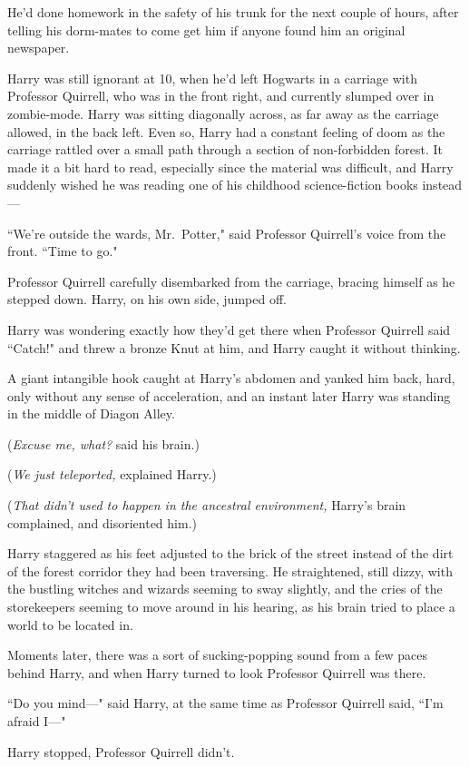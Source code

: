 He'd done homework in the safety of his trunk for the next couple of hours, after telling his dorm-mates to come get him if anyone found him an original newspaper.

Harry was still ignorant at 10\am, when he'd left Hogwarts in a carriage with Professor Quirrell, who was in the front right, and currently slumped over in zombie-mode. Harry was sitting diagonally across, as far away as the carriage allowed, in the back left. Even so, Harry had a constant feeling of doom as the carriage rattled over a small path through a section of non-forbidden forest. It made it a bit hard to read, especially since the material was difficult, and Harry suddenly wished he was reading one of his childhood science-fiction books instead---

``We're outside the wards, Mr.~Potter," said Professor Quirrell's voice from the front. ``Time to go."

Professor Quirrell carefully disembarked from the carriage, bracing himself as he stepped down. Harry, on his own side, jumped off.

Harry was wondering exactly how they'd get there when Professor Quirrell said ``Catch!" and threw a bronze Knut at him, and Harry caught it without thinking.

A giant intangible hook caught at Harry's abdomen and yanked him back, hard, only without any sense of acceleration, and an instant later Harry was standing in the middle of Diagon Alley.

(\emph{Excuse me, what?} said his brain.)

(\emph{We just teleported,} explained Harry.)

(\emph{That didn't used to happen in the ancestral environment,} Harry's brain complained, and disoriented him.)

Harry staggered as his feet adjusted to the brick of the street instead of the dirt of the forest corridor they had been traversing. He straightened, still dizzy, with the bustling witches and wizards seeming to sway slightly, and the cries of the storekeepers seeming to move around in his hearing, as his brain tried to place a world to be located in.

Moments later, there was a sort of sucking-popping sound from a few paces behind Harry, and when Harry turned to look Professor Quirrell was there.

``Do you mind---" said Harry, at the same time as Professor Quirrell said, ``I'm afraid I---"

Harry stopped, Professor Quirrell didn't.

